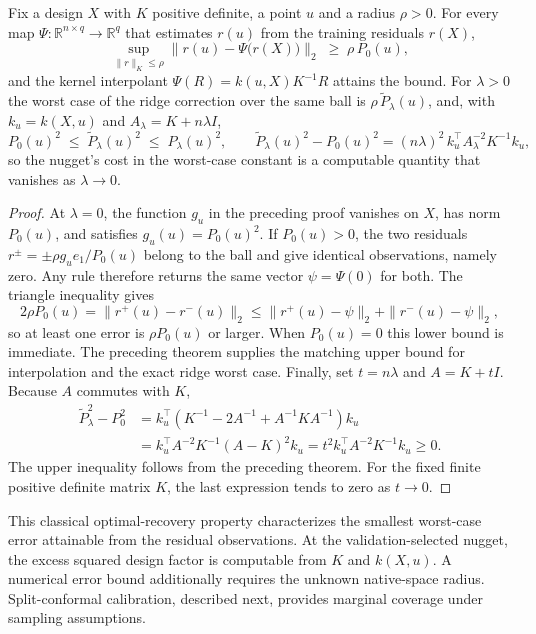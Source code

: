 \documentclass[twoside,11pt]{article}
\begin{document}
\begin{theorem}\label{thm:minimax}
Fix a design $X$ with $K$ positive definite, a point $u$ and a radius
$\rho>0$. For every map $\Psi:\mathbb R^{n\times q}\to\mathbb R^q$ that
estimates $r(u)$ from the training residuals $r(X)$,
\[
\sup_{\|r\|_K\le\rho}\big\|r(u)-\Psi\big(r(X)\big)\big\|_2\;\ge\;\rho\,P_0(u),
\]
and the kernel interpolant $\Psi(R)=k(u,X)K^{-1}R$ attains the bound. For
$\lambda>0$ the worst case of the ridge correction over the same ball is
$\rho\,\widetilde P_\lambda(u)$, and, with $k_u=k(X,u)$ and
$A_\lambda=K+n\lambda I$,
\[
P_0(u)^2\;\le\;\widetilde P_\lambda(u)^2\;\le\;P_\lambda(u)^2,\qquad
\widetilde P_\lambda(u)^2-P_0(u)^2=(n\lambda)^2\,k_u^\top
A_\lambda^{-2}K^{-1}k_u ,
\]
so the nugget's cost in the worst-case constant is a computable quantity that
vanishes as $\lambda\to0$.
\end{theorem}
\begin{proof}
At $\lambda=0$, the function $g_u$ in the preceding proof vanishes on $X$,
has norm $P_0(u)$, and satisfies $g_u(u)=P_0(u)^2$. If $P_0(u)>0$, the
two residuals $r^\pm=\pm\rho g_u e_1/P_0(u)$ belong to the ball and give
identical observations, namely zero. Any rule therefore returns the same
vector $\psi=\Psi(0)$ for both. The triangle inequality gives
\[
2\rho P_0(u)=\|r^+(u)-r^-(u)\|_2
\le\|r^+(u)-\psi\|_2+\|r^-(u)-\psi\|_2,
\]
so at least one error is $\rho P_0(u)$ or larger. When $P_0(u)=0$ this
lower bound is immediate. The preceding theorem supplies the matching
upper bound for interpolation and the exact ridge worst case.
Finally, set $t=n\lambda$ and $A=K+tI$. Because $A$ commutes with $K$,
\begin{align*}
\widetilde P_\lambda^2-P_0^2
&=k_u^\top(K^{-1}-2A^{-1}+A^{-1}KA^{-1})k_u\\
&=k_u^\top A^{-2}K^{-1}(A-K)^2k_u
=t^2k_u^\top A^{-2}K^{-1}k_u\ge0.
\end{align*}
The upper inequality follows from the preceding theorem. For the fixed
finite positive definite matrix $K$, the last expression tends to zero
as $t\to0$.
\end{proof}


This classical optimal-recovery property \citep{owhadi2019operator} characterizes
the smallest worst-case error attainable from the residual observations.
At the validation-selected nugget, the excess squared design factor is
computable from $K$ and $k(X,u)$. A numerical error bound additionally
requires the unknown native-space radius. Split-conformal calibration,
described next, provides marginal coverage under sampling assumptions.
\end{document}
